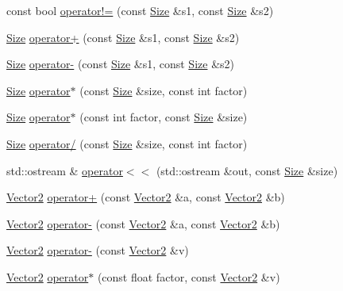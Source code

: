 \begin{DoxyCompactItemize}
\item 
const bool \hyperlink{namespaceprism_a63ab3c18ecc73e21e7281dbe180e07e8}{operator!=} (const \hyperlink{classprism_1_1_size}{Size} \&s1, const \hyperlink{classprism_1_1_size}{Size} \&s2)
\item 
\hyperlink{classprism_1_1_size}{Size} \hyperlink{namespaceprism_a7141aeb35db81548155e44d60c05530e}{operator+} (const \hyperlink{classprism_1_1_size}{Size} \&s1, const \hyperlink{classprism_1_1_size}{Size} \&s2)
\item 
\hyperlink{classprism_1_1_size}{Size} \hyperlink{namespaceprism_ab170e3ca42d85a6766cbc7950ddfb0c4}{operator-\/} (const \hyperlink{classprism_1_1_size}{Size} \&s1, const \hyperlink{classprism_1_1_size}{Size} \&s2)
\item 
\hyperlink{classprism_1_1_size}{Size} \hyperlink{namespaceprism_a3d8e53ee3208e09e8736a77be3f485c9}{operator$\ast$} (const \hyperlink{classprism_1_1_size}{Size} \&size, const int factor)
\item 
\hyperlink{classprism_1_1_size}{Size} \hyperlink{namespaceprism_acd79758984cccce0dddfb459af65f6e1}{operator$\ast$} (const int factor, const \hyperlink{classprism_1_1_size}{Size} \&size)
\item 
\hyperlink{classprism_1_1_size}{Size} \hyperlink{namespaceprism_ad7e100bd6b1730deaab53d1218e29a67}{operator/} (const \hyperlink{classprism_1_1_size}{Size} \&size, const int factor)
\item 
std\+::ostream \& \hyperlink{namespaceprism_ad6335168e27f481d86ae42da444006d1}{operator$<$$<$} (std\+::ostream \&out, const \hyperlink{classprism_1_1_size}{Size} \&size)
\item 
\hyperlink{classprism_1_1_vector2}{Vector2} \hyperlink{namespaceprism_ae482804c32b466401a9ecdf26bc1e6de}{operator+} (const \hyperlink{classprism_1_1_vector2}{Vector2} \&a, const \hyperlink{classprism_1_1_vector2}{Vector2} \&b)
\item 
\hyperlink{classprism_1_1_vector2}{Vector2} \hyperlink{namespaceprism_a86359a88dc5245847de48575a1f969e8}{operator-\/} (const \hyperlink{classprism_1_1_vector2}{Vector2} \&a, const \hyperlink{classprism_1_1_vector2}{Vector2} \&b)
\item 
\hyperlink{classprism_1_1_vector2}{Vector2} \hyperlink{namespaceprism_a124f1081b3a9bbc441dac9927f8a0fc5}{operator-\/} (const \hyperlink{classprism_1_1_vector2}{Vector2} \&v)
\item 
\hyperlink{classprism_1_1_vector2}{Vector2} \hyperlink{namespaceprism_a6528ec4496096e8ccde186bb01fbeed3}{operator$\ast$} (const float factor, const \hyperlink{classprism_1_1_vector2}{Vector2} \&v)

\end{DoxyCompactItemize}
